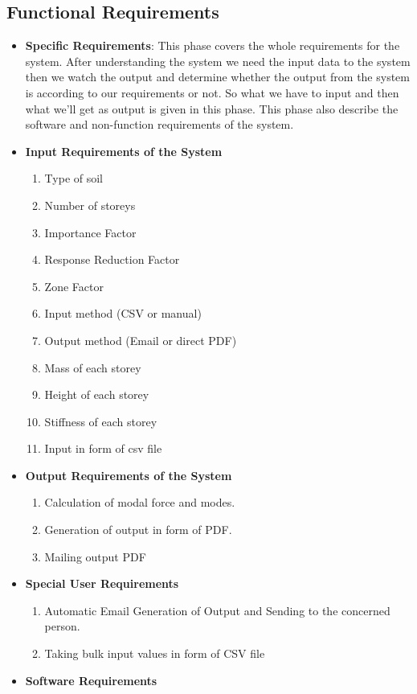 \subsection{Functional Requirements}
\begin{itemize}
\item {\bf Specific Requirements}: This phase covers the whole requirements 
for the system. After understanding the system we need the input data 
to the system then we watch the output and determine whether the output 
from the system is according to our requirements or not. So what we have 
to input and then what we’ll get as output is given in this phase. This 
phase also describe the software and non-function requirements of the 
system.
\item {\bf Input Requirements of the System}
\begin{enumerate} 
\item Type of soil
\item Number of storeys
\item Importance Factor
\item Response Reduction Factor
\item Zone Factor
\item Input method (CSV or manual)
\item Output method (Email or direct PDF)
\item Mass of each storey
\item Height of each storey
\item Stiffness of each storey
\item Input in form of csv file
\end{enumerate}
\vskip 0.5cm
\item {\bf Output Requirements of the System}
\begin{enumerate} 
\item Calculation of modal force and modes.
\item Generation of output in form of PDF.
\item Mailing output PDF 
\end{enumerate}
\vskip 0.5cm
\item {\bf Special User Requirements}
\begin{enumerate} 
\item Automatic Email Generation of Output and Sending to the concerned person.
\item Taking bulk input values in form of CSV file
\end{enumerate}
\vskip 0.5cm
\item {\bf Software Requirements}

\end{itemize}
